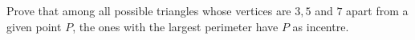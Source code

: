 Prove that among all possible triangles whose vertices are $3,5$ and $7$ apart from a given point $P$,  the ones with the largest perimeter have $P$ as incentre.